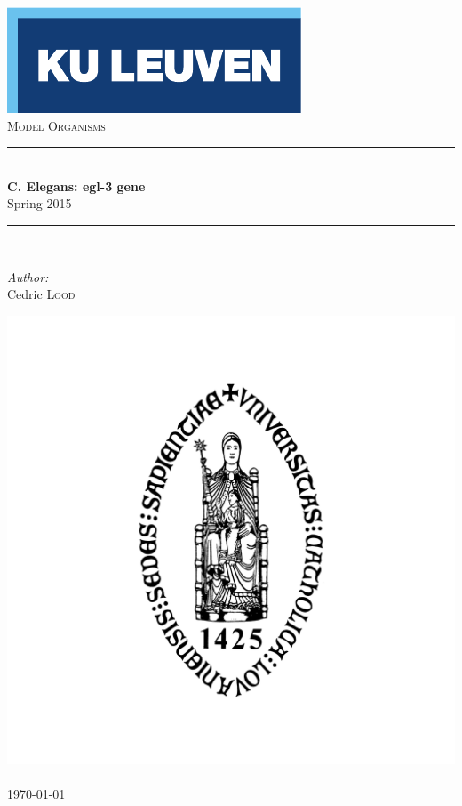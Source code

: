 \begin{titlepage}
  \begin{center}
    
    \includegraphics[scale=1.5]{Figures/kuleuven_logo.pdf}~\\[4.5cm]
    
    \textsc{\Large Model Organisms}\\[0.5cm]
    
    \rule{\linewidth}{0.3mm}\\[0.4cm]
    {\huge \bfseries C. Elegans: egl-3 gene} \\[0.4cm]
    {\large Spring 2015} \\[0.4cm]
    \rule{\linewidth}{0.3mm}\\[1.5cm]
    
    \begin{minipage}{0.4\textwidth}
      \begin{flushleft} \large
        \emph{Author:}\\
        Cedric \textsc{Lood}\\
      \end{flushleft}
    \end{minipage}
    
    \vfill
    
    \includegraphics[scale=0.15]{Figures/KUL.jpg}~\\[0.5cm]

    {\large \today}
    
  \end{center}
\end{titlepage}
